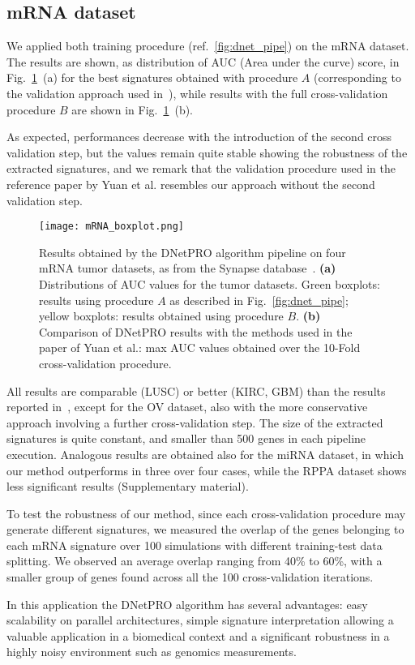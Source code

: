 \documentclass{standalone}
\begin{document}
\subsection[mRNA data]{mRNA dataset}\label{mRNA}

We applied both training procedure (ref.~\ref{fig:dnet_pipe}) on the mRNA dataset.
The results are shown, as distribution of AUC (Area under the curve) score, in Fig.~\ref{fig:dnet_results}~(a) for the best signatures obtained with procedure $A$ (corresponding to the validation approach used in~\cite{Yuan2014}), while results with the full cross-validation procedure $B$ are shown in Fig.~\ref{fig:dnet_results}~(b).

As expected, performances decrease with the introduction of the second cross validation step, but the values remain quite stable showing the robustness of the extracted signatures, and we remark that the validation procedure used in the reference paper by Yuan et al. resembles our approach without the second validation step.

\begin{figure}[htbp]
\texttt{[image: mRNA\_boxplot.png]}
\qquad\qquad
\centering
\def\svgwidth{0.45\textwidth}

\caption{Results obtained by the DNetPRO algorithm pipeline on four mRNA tumor datasets, as from the Synapse database~\cite{Yuan2014}.
\textbf{(a)} Distributions of AUC values for the tumor datasets. Green boxplots: results using procedure $A$ as described in Fig.~\ref{fig:dnet_pipe}; yellow boxplots: results obtained using procedure $B$.
\textbf{(b)} Comparison of DNetPRO results with the methods used in the paper of Yuan et al.: max AUC values obtained over the 10-Fold cross-validation procedure.
}
\label{fig:dnet_results}
\end{figure}

All results are comparable (LUSC) or better (KIRC, GBM) than the results reported in~\cite{Yuan2014}, except for the OV dataset, also with the more conservative approach involving a further cross-validation step.
The size of the extracted signatures is quite constant, and smaller than 500 genes in each pipeline execution.
Analogous results are obtained also for the miRNA dataset, in which our method outperforms in three over four cases, while the RPPA dataset shows less significant results (Supplementary material).

To test the robustness of our method, since each cross-validation procedure may generate different signatures, we measured the overlap of the genes belonging to each mRNA signature over 100 simulations with different training-test data splitting.
We observed an average overlap ranging from 40\% to 60\%, with a smaller group of genes found across all the 100 cross-validation iterations.

In this application the DNetPRO algorithm has several advantages: easy scalability on parallel architectures, simple signature interpretation allowing a valuable application in a biomedical context and a significant robustness in a highly noisy environment such as genomics measurements.
\end{document}
